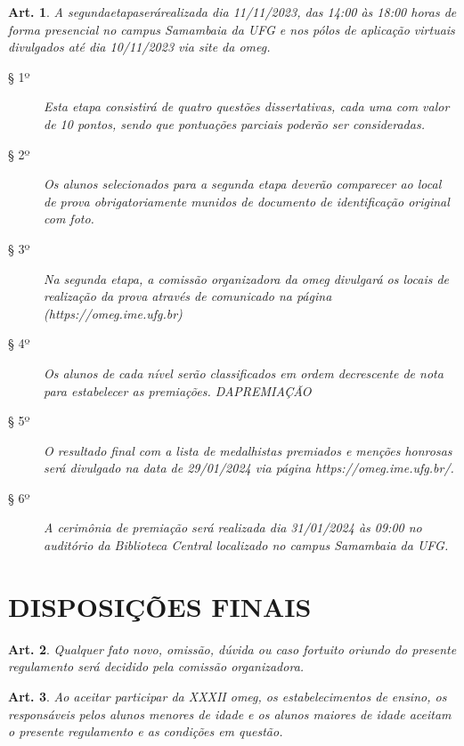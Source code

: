\documentclass[a4paper,12pt]{article}
\newtheorem{article}{Art.}
\begin{document}
\begin{article}
  A segundaetapaserárealizada dia 11/11/2023, das 14:00 às 18:00 horas de
  forma presencial no campus Samambaia da UFG e nos pólos de aplicação
  virtuais divulgados até dia 10/11/2023 via site da \acrshort{omeg}.
  \begin{description}
    \item[§ 1º]
      Esta etapa consistirá de quatro questões dissertativas, cada uma com
      valor de 10 pontos, sendo que pontuações parciais poderão ser
      consideradas.
    \item[§ 2º]
      Os alunos selecionados para a segunda etapa deverão comparecer ao
      local de prova obrigatoriamente munidos de documento de identificação
      original com foto.
    \item[§ 3º]
      Na segunda etapa, a comissão organizadora da \acrshort{omeg} divulgará os
      locais de realização da prova através de comunicado na página
      (https://omeg.ime.ufg.br)
    \item[§ 4º]
      Os alunos de cada nível serão classificados em ordem decrescente de
      nota para estabelecer as premiações.
      DAPREMIAÇÃO
    \item[§ 5º]
      O resultado final com a lista de medalhistas premiados e menções
      honrosas será divulgado na data de 29/01/2024 via página
      https://omeg.ime.ufg.br/.
    \item[§ 6º]
      A cerimônia de premiação será realizada dia 31/01/2024 às 09:00 no
      auditório da Biblioteca Central localizado no campus Samambaia da UFG.
  \end{description}
\end{article}

\section{DISPOSIÇÕES FINAIS}

\begin{article}
  Qualquer fato novo, omissão, dúvida ou caso fortuito oriundo do presente
  regulamento será decidido pela comissão organizadora.
\end{article}

\begin{article}
  Ao aceitar participar da XXXII \acrshort{omeg}, os estabelecimentos de ensino, os
  responsáveis pelos alunos menores de idade e os alunos maiores de idade
  aceitam o presente regulamento e as condições em questão.
\end{article}
\end{document}
